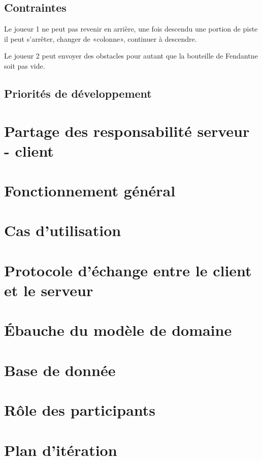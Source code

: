 \documentclass[a4paper,11pt]{article}
\begin{document}
	\subsection{Contraintes}
	Le joueur 1 ne peut pas revenir en arrière, une fois descendu une portion de piste il peut s'arrêter, changer de «colonne», continuer à descendre. \par

	Le joueur 2 peut envoyer des obstacles pour autant que la bouteille de Fendant\texttrademark ne soit pas vide.

	\subsection{Priorités de développement}

	\section{Partage des responsabilité serveur - client}

	\section{Fonctionnement général}

	\section{Cas d'utilisation}

	\section{Protocole d'échange entre le client et le serveur}

	\section{Ébauche du modèle de domaine}

	\section{Base de donnée}

	\section{Rôle des participants}

	\section{Plan d'itération}
\end{document}
